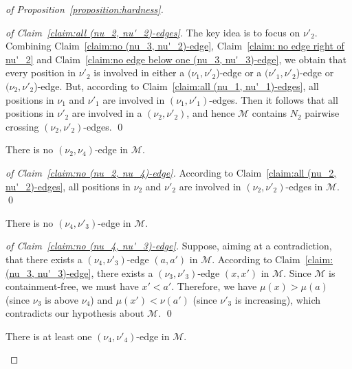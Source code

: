\begin{proof}[of Proposition~\ref{proposition:hardness}]
  \begin{proof}[of Claim~\ref{claim:all (nu_2, nu'_2)-edges}]
    The key idea is to focus on $\nu'_2$.
    Combining Claim~\ref{claim:no (nu_3, nu'_2)-edge},
    Claim~\ref{claim: no edge right of nu'_2} and
    Claim~\ref{claim:no edge below one (nu_3, nu'_3)-edge},
    we obtain that every position in $\nu'_2$ is involved in
    either a $(\nu_1, \nu'_2$)-edge
    or a $(\nu'_1, \nu'_2$)-edge
    or $(\nu_2, \nu'_2$)-edge.
    But, according to Claim~\ref{claim:all (nu_1, nu'_1)-edges},
    all positions in $\nu_1$ and $\nu'_1$ are involved in
    $(\nu_1, \nu'_1)$-edges.
    Then it follows that
    all positions in $\nu'_2$ are involved in a $(\nu_2, \nu'_2)$,
    and hence
    $\mathcal{M}$ contains $N_2$ pairwise crossing $(\nu_2, \nu'_2)$-edges.
    \qed
  \end{proof}

  \begin{claim}
    \label{claim:no (nu_2, nu_4)-edge}
    There is no $(\nu_2, \nu_4)$-edge in $\mathcal{M}$.
  \end{claim}

  \begin{proof}[of Claim~\ref{claim:no (nu_2, nu_4)-edge}]
    According to Claim~\ref{claim:all (nu_2, nu'_2)-edges},
    all positions in $\nu_2$ and $\nu'_2$ are involved in
    $(\nu_2, \nu'_2)$-edges in $\mathcal{M}$.
    \qed
  \end{proof}

  \begin{claim}
    \label{claim:no (nu_4, nu'_3)-edge}
    There is no $(\nu_4, \nu'_3)$-edge in $\mathcal{M}$.
  \end{claim}

  \begin{proof}[of Claim~\ref{claim:no (nu_4, nu'_3)-edge}]
    Suppose, aiming at a contradiction, that there exists
    a $(\nu_4, \nu'_3)$-edge $(a, a')$ in $\mathcal{M}$.
    According to Claim~\ref{claim:(nu_3, nu'_3)-edge},
    there exists a $(\nu_3, \nu'_3)$-edge $(x, x')$
    in $\mathcal{M}$.
    Since $\mathcal{M}$ is containment-free, we must have
    $x' < a'$.
    Therefore,
    we have $\mu(x) > \mu(a)$ (since $\nu_3$ is above $\nu_4$) and
    $\mu(x') < \nu(a')$ (since $\nu'_3$ is increasing),
    which contradicts our hypothesis about $\mathcal{M}$.
    \qed
  \end{proof}

  \begin{claim}
    \label{claim:(nu_4, nu'_4)-edge}
    There is at least one $(\nu_4, \nu'_4)$-edge in $\mathcal{M}$.
  \end{claim}


\end{proof}
